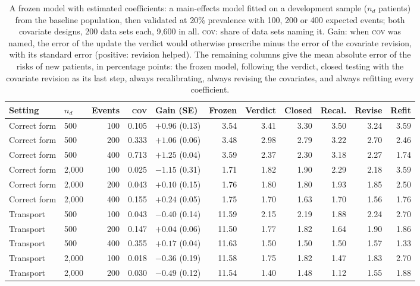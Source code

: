 \begin{table}[p]\centering\footnotesize\setlength{\tabcolsep}{4pt}
\caption{A frozen model with estimated coefficients: a main-effects model fitted on a development sample ($n_d$ patients) from the baseline population, then validated at 20\% prevalence with 100, 200 or 400 expected events; both covariate designs, 200 data sets each, 9,600 in all. \textsc{cov}: share of data sets naming it. Gain: when \textsc{cov} was named, the error of the update the verdict would otherwise prescribe minus the error of the covariate revision, with its standard error (positive: revision helped). The remaining columns give the mean absolute error of the risks of new patients, in percentage points: the frozen model, following the verdict, closed testing with the covariate revision as its last step, always recalibrating, always revising the covariates, and always refitting every coefficient.}
\label{tab:estdev}
\begin{tabular}{llrrlrrrrrr}
\toprule
Setting & $n_d$ & Events & \textsc{cov} & Gain (SE) & Frozen & Verdict & Closed & Recal. & Revise & Refit \\
\midrule
Correct form & 500 & 100 & 0.105 & $+0.96$ (0.13) & 3.54 & 3.41 & 3.30 & 3.50 & 3.24 & 3.59 \\
Correct form & 500 & 200 & 0.333 & $+1.06$ (0.06) & 3.48 & 2.98 & 2.79 & 3.22 & 2.70 & 2.46 \\
Correct form & 500 & 400 & 0.713 & $+1.25$ (0.04) & 3.59 & 2.37 & 2.30 & 3.18 & 2.27 & 1.74 \\
Correct form & 2,000 & 100 & 0.025 & $-1.15$ (0.31) & 1.71 & 1.82 & 1.90 & 2.29 & 2.18 & 3.59 \\
Correct form & 2,000 & 200 & 0.043 & $+0.10$ (0.15) & 1.76 & 1.80 & 1.80 & 1.93 & 1.85 & 2.50 \\
Correct form & 2,000 & 400 & 0.155 & $+0.24$ (0.05) & 1.75 & 1.70 & 1.63 & 1.70 & 1.56 & 1.76 \\
\addlinespace
Transport & 500 & 100 & 0.043 & $-0.40$ (0.14) & 11.59 & 2.15 & 2.19 & 1.88 & 2.24 & 2.70 \\
Transport & 500 & 200 & 0.147 & $+0.04$ (0.06) & 11.50 & 1.77 & 1.82 & 1.64 & 1.90 & 1.86 \\
Transport & 500 & 400 & 0.355 & $+0.17$ (0.04) & 11.63 & 1.50 & 1.50 & 1.50 & 1.57 & 1.33 \\
Transport & 2,000 & 100 & 0.018 & $-0.36$ (0.19) & 11.58 & 1.75 & 1.82 & 1.47 & 1.83 & 2.70 \\
Transport & 2,000 & 200 & 0.030 & $-0.49$ (0.12) & 11.54 & 1.40 & 1.48 & 1.12 & 1.55 & 1.88 \\

\end{tabular}
\end{table}
